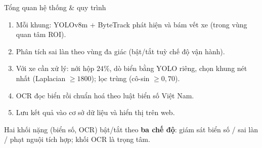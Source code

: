 \documentclass[aspectratio=169,9pt]{beamer}
\begin{document}
\begin{frame}{Tổng quan hệ thống \& quy trình}
\begin{center}
\end{center}
{\scriptsize
\begin{enumerate}
  \item Mỗi khung: YOLOv8m + ByteTrack phát hiện và bám vết xe (trong vùng quan tâm ROI).
  \item Phân tích sai làn theo vùng đa giác (bật/tắt tuỳ chế độ vận hành).
  \item Với xe cần xử lý: nới hộp \(24\%\), dò biển bằng YOLO riêng, chọn khung nét nhất (Laplacian \(\ge 1800\)); lọc trùng (cô-sin \(\ge 0{,}70\)).
  \item OCR đọc biển rồi chuẩn hoá theo luật biển số Việt Nam.
  \item Lưu kết quả vào cơ sở dữ liệu và hiển thị trên web.
\end{enumerate}}
{\footnotesize Hai khối nặng (biển số, OCR) bật/tắt theo \textbf{ba chế độ}: giám sát biển số / sai làn / phạt nguội tích hợp; khối \alert{OCR} là trọng tâm.}
\end{frame}
\end{document}
